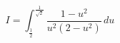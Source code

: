 \begin{displaymath}
 I=\int_{\frac{1}{2}}^{\frac{1}{\sqrt{2}}}\frac{1-u^2}{u^2(2-u^2)}\,du
\end{displaymath}
